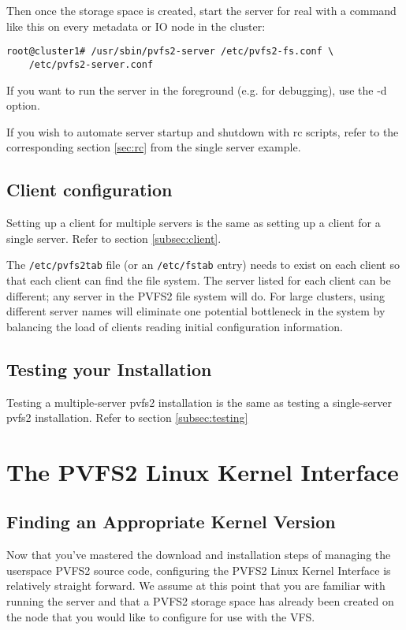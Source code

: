 \documentclass[11pt, letterpaper]{article}
\begin{document}
Then once the storage space is created, start the server for real with a
command like this on every metadata or IO node in the cluster:

\begin{verbatim}
root@cluster1# /usr/sbin/pvfs2-server /etc/pvfs2-fs.conf \
	/etc/pvfs2-server.conf
\end{verbatim}

If you want to run the server in the foreground (e.g. for debugging), use the
-d option.

If you wish to automate server startup and shutdown with rc scripts, refer
to the corresponding section \ref{sec:rc} from the single server example.

\subsection{Client configuration}

Setting up a client for multiple servers is the same as setting up a client
for a single server.  Refer to section \ref{subsec:client}.

The \texttt{/etc/pvfs2tab} file (or an \texttt{/etc/fstab} entry) needs to
exist on each client so that each client can find the file system.  The server
listed for each client can be different; any server in the PVFS2 file system
will do.  For large clusters, using different server names will eliminate one
potential bottleneck in the system by balancing the load of clients reading
initial configuration information.

\subsection {Testing your Installation}

Testing a multiple-server pvfs2 installation is the same as testing a
single-server pvfs2 installation.  Refer to section
\ref{subsec:testing}

\section{The PVFS2 Linux Kernel Interface}
\subsection{Finding an Appropriate Kernel Version}
\label{sec:kernel-check}

Now that you've mastered the download and installation steps of
managing the userspace PVFS2 source code, configuring the PVFS2 Linux
Kernel Interface is relatively straight forward.  We assume at this
point that you are familiar with running the server and that a PVFS2
storage space has already been created on the node that you would like
to configure for use with the VFS.
\end{document}
